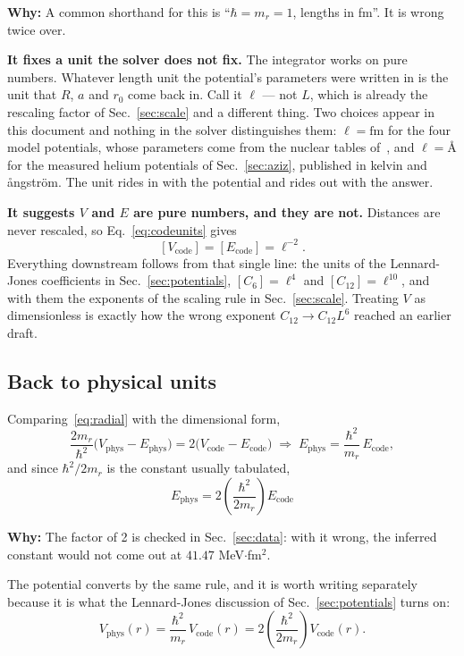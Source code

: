 \documentclass[11pt,a4paper]{article}
\newcommand{\why}[1]{\medskip\noindent\textbf{Why:} #1\medskip}
\begin{document}
\why{A common shorthand for this is ``$\hbar = m_r = 1$, lengths in fm''. It is
wrong twice over.

\textbf{It fixes a unit the solver does not fix.} The integrator works on pure
numbers. Whatever length unit the potential's parameters were written in is the
unit that $R$, $a$ and $r_0$ come back in. Call it $\ell$ --- not $L$, which is
already the rescaling factor of Sec.~\ref{sec:scale} and a different thing. Two
choices appear in this document and nothing in the solver distinguishes them:
$\ell=\mathrm{fm}$ for the four model potentials, whose parameters come from the
nuclear tables of~\cite{rbef}, and $\ell=\text{\AA}$ for the measured helium
potentials of Sec.~\ref{sec:aziz}, published in kelvin and \aa ngstr\"om. The
unit rides in with the potential and rides out with the answer.

\textbf{It suggests $V$ and $E$ are pure numbers, and they are not.} Distances
are never rescaled, so Eq.~\eqref{eq:codeunits} gives
\[
  [V_{\mathrm{code}}] = [E_{\mathrm{code}}] = \ell^{-2}.
\]
Everything downstream follows from that single line: the units of the
Lennard-Jones coefficients in Sec.~\ref{sec:potentials}, $[C_6]=\ell^4$ and
$[C_{12}]=\ell^{10}$, and with them the exponents of the scaling rule in
Sec.~\ref{sec:scale}. Treating $V$ as dimensionless is exactly how the wrong
exponent $C_{12}\to C_{12}L^6$ reached an earlier draft.}

\subsection*{Back to physical units}

Comparing~\eqref{eq:radial} with the dimensional form,
\[
  \frac{2m_r}{\hbar^2}\bigl(V_{\text{phys}} - E_{\text{phys}}\bigr)
  = 2\bigl(V_{\text{code}} - E_{\text{code}}\bigr)
  \;\Longrightarrow\;
  E_{\text{phys}} = \frac{\hbar^2}{m_r}\,E_{\text{code}},
\]
and since $\hbar^2/2m_r$ is the constant usually tabulated,
\begin{equation}
  \boxed{\;E_{\text{phys}} = 2\left(\frac{\hbar^2}{2m_r}\right) E_{\text{code}}\;}
  \label{eq:conversion}
\end{equation}

\why{The factor of 2 is checked in
Sec.~\ref{sec:data}: with it wrong, the inferred constant would not come out at
$41.47$ MeV$\cdot$fm$^2$.}

The potential converts by the same rule, and it is worth writing separately
because it is what the Lennard-Jones discussion of Sec.~\ref{sec:potentials}
turns on:
\begin{equation}
  V_{\mathrm{phys}}(r) = \frac{\hbar^2}{m_r}\,V_{\mathrm{code}}(r)
  = 2\left(\frac{\hbar^2}{2m_r}\right) V_{\mathrm{code}}(r).
  \label{eq:vconversion}
\end{equation}
\end{document}
